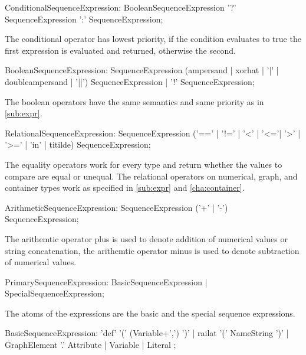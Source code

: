 \begin{rail}
  ConditionalSequenceExpression: 
    BooleanSequenceExpression '?' SequenceExpression ':' SequenceExpression;
\end{rail}

The conditional operator has lowest priority, if the condition evaluates to true the first expression is evaluated and returned, otherwise the second.

\begin{rail}
  BooleanSequenceExpression: 
    SequenceExpression (ampersand | xorhat | '|' | doubleampersand | '||') SequenceExpression |
    '!' SequenceExpression;
\end{rail}

The boolean operators have the same semantics and same priority as in \ref{sub:expr}.

\begin{rail}
  RelationalSequenceExpression: 
    SequenceExpression ('==' | '!=' | '<' | '<='| '>' | '>=' | 'in' | titilde) SequenceExpression;
\end{rail}

The equality operators work for every type and return whether the values to compare are equal or unequal.
The relational operators on numerical, graph, and container types work as specified in \ref{sub:expr} and \ref{cha:container}.

\begin{rail}
  ArithmeticSequenceExpression:
    SequenceExpression ('+' | '-') SequenceExpression;
\end{rail}

The arithemtic operator plus is used to denote addition of numerical values or string concatenation,
the arithemtic operator minus is used to denote subtraction of numerical values.

\begin{rail}
  PrimarySequenceExpression:
    BasicSequenceExpression |
    SpecialSequenceExpression;
\end{rail}

The atoms of the expressions are the basic and the special sequence expressions.

\begin{rail}
  BasicSequenceExpression:
    'def' '(' (Variable+',') ')' |
	  railat '(' NameString ')' |
 	  GraphElement '.' Attribute |
	  Variable | 
    Literal
  ;
\end{rail}

